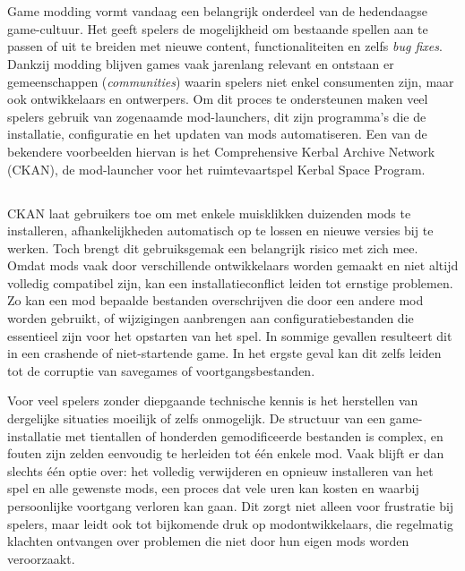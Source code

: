 
\chapter{}%
\label{ch:inleiding}

Game modding vormt vandaag een belangrijk onderdeel van de hedendaagse game-cultuur. Het geeft spelers de mogelijkheid om bestaande spellen aan te passen of uit te breiden met nieuwe content, functionaliteiten en zelfs \textit{bug fixes}. Dankzij modding blijven games vaak jarenlang relevant en ontstaan er gemeenschappen (\textit{communities}) waarin spelers niet enkel consumenten zijn, maar ook ontwikkelaars en ontwerpers. Om dit proces te ondersteunen maken veel spelers gebruik van zogenaamde mod-launchers, dit zijn programma’s die de installatie, configuratie en het updaten van mods automatiseren. Een van de bekendere voorbeelden hiervan is het Comprehensive Kerbal Archive Network (CKAN), de mod-launcher voor het ruimtevaartspel Kerbal Space Program.

\section{}%
\label{sec:probleemstelling}

CKAN laat gebruikers toe om met enkele muisklikken duizenden mods te installeren, afhankelijkheden automatisch op te lossen en nieuwe versies bij te werken. Toch brengt dit gebruiksgemak een belangrijk risico met zich mee. Omdat mods vaak door verschillende ontwikkelaars worden gemaakt en niet altijd volledig compatibel zijn, kan een installatieconflict leiden tot ernstige problemen. Zo kan een mod bepaalde bestanden overschrijven die door een andere mod worden gebruikt, of wijzigingen aanbrengen aan configuratiebestanden die essentieel zijn voor het opstarten van het spel. In sommige gevallen resulteert dit in een crashende of niet-startende game. In het ergste geval kan dit zelfs leiden tot de corruptie van savegames of voortgangsbestanden.

Voor veel spelers zonder diepgaande technische kennis is het herstellen van dergelijke situaties moeilijk of zelfs onmogelijk. De structuur van een game-installatie met tientallen of honderden gemodificeerde bestanden is complex, en fouten zijn zelden eenvoudig te herleiden tot één enkele mod. Vaak blijft er dan slechts één optie over: het volledig verwijderen en opnieuw installeren van het spel en alle gewenste mods, een proces dat vele uren kan kosten en waarbij persoonlijke voortgang verloren kan gaan. Dit zorgt niet alleen voor frustratie bij spelers, maar leidt ook tot bijkomende druk op modontwikkelaars, die regelmatig klachten ontvangen over problemen die niet door hun eigen mods worden veroorzaakt.

